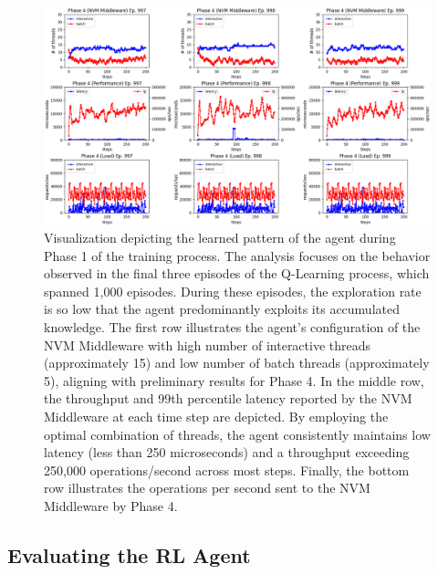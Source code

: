 \begin{figure}[!htb]
  \centering
  \includegraphics[width=\textwidth,height=\textheight,keepaspectratio,angle=0]{images/rl_training_phase4.png}
  \caption[Learned Pattern of Agent during Phase 3]{Visualization depicting the learned pattern of the agent during Phase 1 of the training process. The analysis focuses on the behavior observed in the final three episodes of the Q-Learning process, which spanned 1,000 episodes. During these episodes, the exploration rate is so low that the agent predominantly exploits its accumulated knowledge. The first row illustrates the agent's configuration of the NVM Middleware with high number of interactive threads (approximately 15) and low number of batch threads (approximately 5), aligning with preliminary results for Phase 4. In the middle row, the throughput and 99th percentile latency reported by the NVM Middleware at each time step are depicted. By employing the optimal combination of threads, the agent consistently maintains low latency (less than 250 microseconds) and a throughput exceeding 250,000 operations/second across most steps. Finally, the bottom row illustrates the operations per second sent to the NVM Middleware by Phase 4.}
  \label{fig:learned_phase_4}
\end{figure}

\FloatBarrier

\subsection*{Evaluating the RL Agent}

